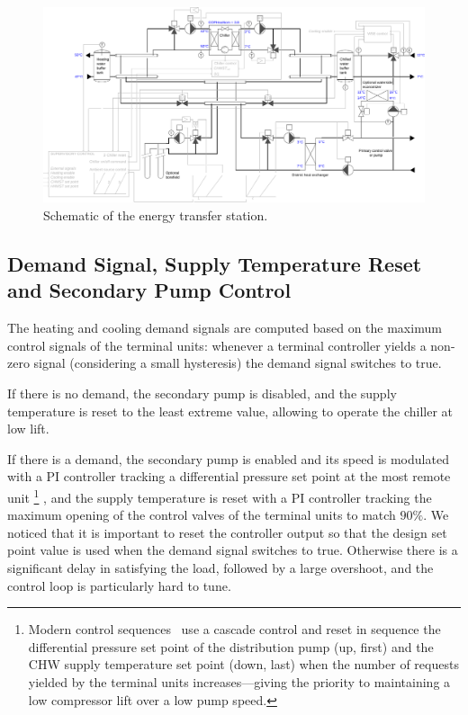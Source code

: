 \begin{figure}[!htbp]
\centering
\includegraphics[width=\linewidth]{figures/ChillerBorefield.pdf}
\caption{Schematic of the energy transfer station.}
\label{fig:schematic}
\end{figure}


\subsection{Demand Signal, Supply Temperature Reset and Secondary Pump Control} \label{sec:demand}

The heating and cooling demand signals are computed based on the maximum control signals of the terminal units: whenever a terminal controller yields a non-zero signal (considering a small hysteresis) the demand signal switches to true.

If there is no demand, the secondary pump is disabled, and the supply temperature is reset to the least extreme value, allowing to operate the chiller at low lift.

If there is a demand, the secondary pump is enabled and its speed is modulated with a PI controller tracking a differential pressure set point at the most remote unit%
\footnote{Modern control sequences~\cite{Llp2019} use a cascade control and reset in sequence the differential pressure set point of the distribution pump (up, first) and the CHW supply temperature set point (down, last) when the number of requests yielded by the terminal units increases---giving the priority to maintaining a low compressor lift over a low pump speed.}%
, and the supply temperature is reset with a PI controller tracking the maximum opening of the control valves of the terminal units to match $90\%$.
We noticed that it is important to reset the controller output so that the design set point value is used when the demand signal switches to true. Otherwise there is a significant delay in satisfying the load, followed by a large overshoot, and the control loop is particularly hard to tune.

